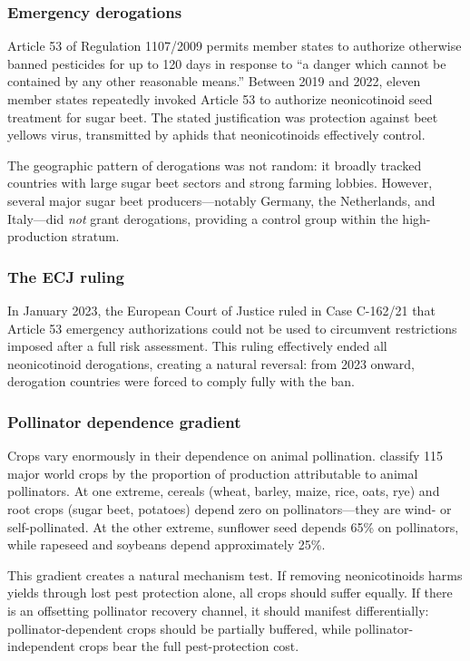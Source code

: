 \documentclass[12pt]{article}
\begin{document}
\subsubsection*{Emergency derogations} Article 53 of Regulation 1107/2009 permits member states to authorize otherwise banned pesticides for up to 120 days in response to ``a danger which cannot be contained by any other reasonable means.'' Between 2019 and 2022, eleven member states repeatedly invoked Article 53 to authorize neonicotinoid seed treatment for sugar beet. The stated justification was protection against beet yellows virus, transmitted by aphids that neonicotinoids effectively control.

The geographic pattern of derogations was not random: it broadly tracked countries with large sugar beet sectors and strong farming lobbies. However, several major sugar beet producers---notably Germany, the Netherlands, and Italy---did \textit{not} grant derogations, providing a control group within the high-production stratum.

\subsubsection*{The ECJ ruling} In January 2023, the European Court of Justice ruled in Case C-162/21 that Article 53 emergency authorizations could not be used to circumvent restrictions imposed after a full risk assessment. This ruling effectively ended all neonicotinoid derogations, creating a natural reversal: from 2023 onward, derogation countries were forced to comply fully with the ban.

\subsubsection*{Pollinator dependence gradient} Crops vary enormously in their dependence on animal pollination. \citet{klein2007importance} classify 115 major world crops by the proportion of production attributable to animal pollinators. At one extreme, cereals (wheat, barley, maize, rice, oats, rye) and root crops (sugar beet, potatoes) depend zero on pollinators---they are wind- or self-pollinated. At the other extreme, sunflower seed depends 65\% on pollinators, while rapeseed and soybeans depend approximately 25\%.

This gradient creates a natural mechanism test. If removing neonicotinoids harms yields through lost pest protection alone, all crops should suffer equally. If there is an offsetting pollinator recovery channel, it should manifest differentially: pollinator-dependent crops should be partially buffered, while pollinator-independent crops bear the full pest-protection cost.
\end{document}
